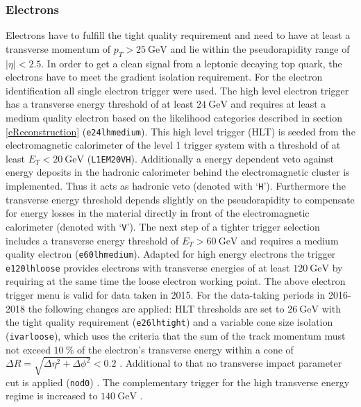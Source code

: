 \subsubsection*{Electrons}
Electrons have to fulfill the tight quality requirement and need to have at least a transverse momentum of $p_T>\SI{25}{\giga\electronvolt}$ and lie within the pseudorapidity range of $|\eta|<2.5$. In order to get a clean signal from a leptonic decaying top quark, the electrons have to meet the gradient isolation requirement. For the electron identification all single electron trigger were used.\newline
The high level electron trigger has a transverse energy threshold of at least $\SI{24}{\giga\electronvolt}$ and requires at least a medium quality electron based on the likelihood categories described in section \ref{eReconstruction} (\texttt{e24\textunderscore lhmedium}). This high level trigger (HLT) is seeded from the electromagnetic calorimeter of the level 1 trigger system with a threshold of at least $E_T<\SI{20}{\giga\electronvolt}$ (\texttt{L1EM20VH}). Additionally a energy dependent veto against energy deposits in the hadronic calorimeter behind  the electromagnetic cluster is implemented. Thus it acts as hadronic veto (denoted with `\texttt{H}'). Furthermore the transverse energy threshold depends slightly on the pseudorapidity to compensate for energy losses in the material directly in front of the electromagnetic calorimeter (denoted with `\texttt{V}'). The next step of a tighter trigger selection includes a transverse energy threshold of $E_T>\SI{60}{\giga\electronvolt}$ and requires a medium quality electron (\texttt{e60\textunderscore lhmedium}). Adapted for high energy electrons the trigger \texttt{e120\textunderscore lhloose} provides electrons with transverse energies of at least $\SI{120}{\giga\electronvolt}$ by requiring at the same time the loose electron working point. \cite{trigger:e:mu} The above electron trigger menu is valid for data taken in 2015. For the data-taking periods in 2016-2018 the following changes are applied:\newline
HLT thresholds are set to $\SI{26}{\giga\electronvolt}$ with the tight quality requirement (\texttt{e26\textunderscore lhtight}) and a variable cone size isolation (\texttt{ivarloose}), which uses the criteria that the sum of the track momentum must not exceed $\SI{10}{\percent}$ of the electron's transverse energy within a cone of $\Delta R=\sqrt{\Delta\eta^2+\Delta\phi^2}<0.2$ \cite{trigger:ivarloose:erkl}\cite{trigger:ivarloose:form}. Additional to that no transverse impact parameter cut is applied (\texttt{nod0}) \cite{trigger:ivarloose:erkl}. The complementary trigger for the high transverse energy regime is increased to $\SI{140}{\giga\electronvolt}$ \cite{trigger:e:mu}.
